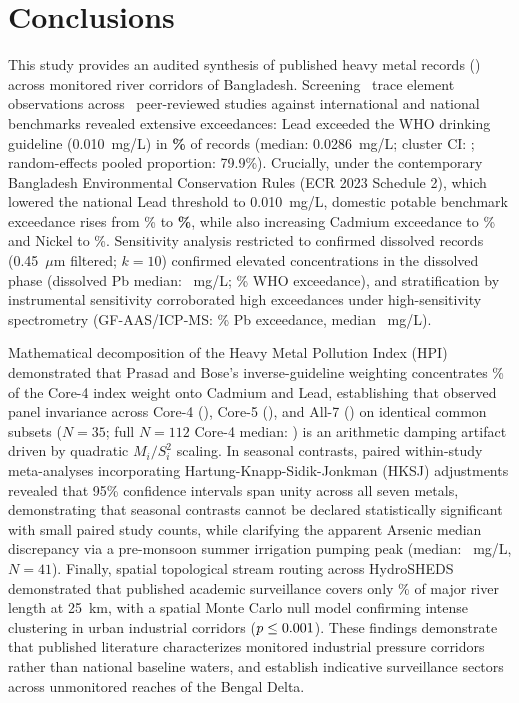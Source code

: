 \documentclass[authoryear,preprint,12pt]{elsarticle}
\begin{document}
\section{Conclusions}
This study provides an audited synthesis of published heavy metal records (\StudyWindowYears) across monitored river corridors of Bangladesh. Screening \TotalMetalRecords\ trace element observations across \TotalMetalStudies\ peer-reviewed studies against international and national benchmarks revealed extensive exceedances: Lead exceeded the WHO drinking guideline (0.010~mg/L) in \textbf{\LeadWhoExceedPct\%} of records (median: 0.0286~mg/L; cluster CI: \LeadWhoClusterCi; random-effects pooled proportion: 79.9\%). Crucially, under the contemporary Bangladesh Environmental Conservation Rules (ECR 2023 Schedule 2), which lowered the national Lead threshold to 0.010~mg/L, domestic potable benchmark exceedance rises from \LeadBdNineteenNinetySevenExceedPct\% to \textbf{\LeadBdTwentyTwentyThreeExceedPct\%}, while also increasing Cadmium exceedance to \CadmiumBdTwentyTwentyThreeExceedPct\% and Nickel to \NickelBdTwentyTwentyThreeExceedPct\%. Sensitivity analysis restricted to confirmed dissolved records (0.45~$\mu\text{m}$ filtered; $k=10$) confirmed elevated concentrations in the dissolved phase (dissolved Pb median: \LeadConfirmedDissolvedMedian~mg/L; \LeadConfirmedDissolvedWhoPct\% WHO exceedance), and stratification by instrumental sensitivity corroborated high exceedances under high-sensitivity spectrometry (GF-AAS/ICP-MS: \LeadHighSensExceedPct\% Pb exceedance, median \LeadHighSensMedian~mg/L).

Mathematical decomposition of the Heavy Metal Pollution Index ($\mathrm{HPI}$) demonstrated that Prasad and Bose's inverse-guideline weighting concentrates \HpiCdPbWeightSharePct\% of the Core-4 index weight onto Cadmium and Lead, establishing that observed panel invariance across Core-4 (\HpiCommonSubsetCoreFourMedian), Core-5 (\HpiCommonSubsetCoreFiveMedian), and All-7 (\HpiCommonSubsetAllSevenMedian) on identical common subsets ($N=35$; full $N=112$ Core-4 median: \HpiCoreFourMedian) is an arithmetic damping artifact driven by quadratic $M_i/S_i^2$ scaling. In seasonal contrasts, paired within-study meta-analyses incorporating Hartung-Knapp-Sidik-Jonkman (HKSJ) adjustments revealed that 95\% confidence intervals span unity across all seven metals, demonstrating that seasonal contrasts cannot be declared statistically significant with small paired study counts, while clarifying the apparent Arsenic median discrepancy via a pre-monsoon summer irrigation pumping peak (median: \ArsenicPremonsoonMedian~mg/L, $N=41$). Finally, spatial topological stream routing across HydroSHEDS demonstrated that published academic surveillance covers only \ObservedCoveredPct\% of major river length at 25~km, with a spatial Monte Carlo null model confirming intense clustering in urban industrial corridors ($p \le 0.001$). These findings demonstrate that published literature characterizes monitored industrial pressure corridors rather than national baseline waters, and establish indicative surveillance sectors across unmonitored reaches of the Bengal Delta.
\end{document}
